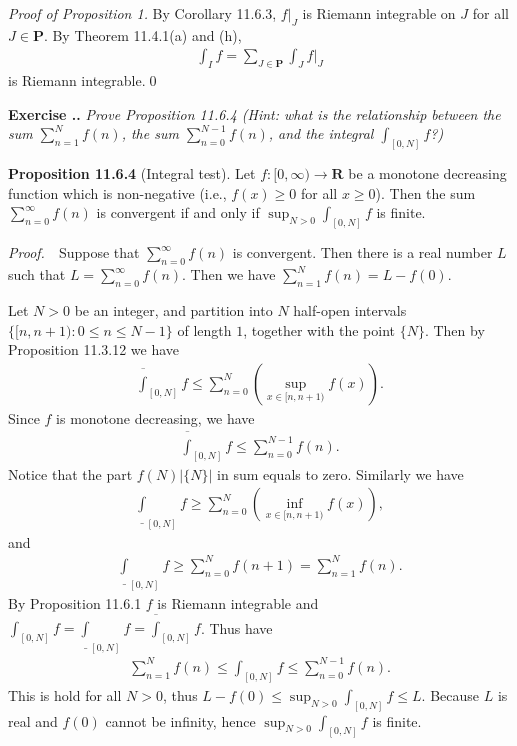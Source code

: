 \documentclass{book}
\newcommand{\pff}{\vspace{.25em}\noindent\emph{Proof.}~~}
\newcommand{\titl}[1]{\noindent\textbf{#1}}
\newcounter{Exercise}[section]
\renewcommand{\theExercise}{\thesection.\arabic{Exercise}.}
\newcommand{\new}{\vspace{1.5em}\noindent\textbf{{Exercise \stepcounter{Exercise}\textbf{\theExercise}}} }
\begin{document}
\noindent\emph{Proof of Proposition 1.} By Corollary 11.6.3, $f|_J$ is Riemann integrable on $J$ for all $J\in\mathbf{P}$. By Theorem 11.4.1(a) and (h),
    \begin{align*}
        \int_If=\sum_{J\in\mathbf{P}}\int_{J}f|_J
    \end{align*}
is Riemann integrable.\qed

\new\emph{Prove Proposition 11.6.4 (Hint: what is the relationship between the sum $\sum_{n = 1}^{N} f(n)$, the sum $\sum_{n = 0}^{N - 1} f(n)$, and the integral $\int_{[0, N]} f$?)}

\begin{framed}
\titl{Proposition 11.6.4} (Integral test). Let $f : [0, \infty) \to \mathbf{R}$ be a monotone decreasing function which is non-negative (i.e., $f(x) \geq 0$ for all $x \geq 0$). Then the sum $\sum_{n = 0}^{\infty} f(n)$ is convergent if and only if $\sup_{N > 0} \int_{[0, N]} f$ is finite.
\end{framed}

\pff Suppose that $\sum_{n = 0}^{\infty} f(n)$ is convergent. Then there is a real number $L$ such that $L = \sum_{n = 0}^{\infty} f(n)$. Then we have $\sum_{n = 1}^{N} f(n) = L - f(0)$.

Let $N > 0$ be an integer, and partition into $N$ half-open intervals $\{ [n, n + 1) : 0 \leq n \leq N - 1 \}$ of length $1$, together with the point $\{ N \}$. Then by Proposition 11.3.12 we have
    \begin{align*}
        \overline\int_{[0, N]} f \leq \sum_{n = 0}^{N} \left(\sup_{x \in [n, n+1)}f(x)\right).
    \end{align*}
Since $f$ is monotone decreasing, we have
    \begin{align*}
        \overline\int_{[0, N]} f \leq \sum_{n = 0}^{N - 1} f(n).
    \end{align*}
Notice that the part $f(N)|\{N\}|$ in sum equals to zero. Similarly we have
    \begin{align*}
        \underline\int_{[0, N]} f \geq \sum_{n = 0}^{N} \left(\inf_{x \in [n, n+1)} f(x)\right),
    \end{align*}
and
    \begin{align*}
        \underline\int_{[0, N]} f \geq \sum_{n = 0}^{N} f(n+1) = \sum_{n = 1}^{N} f(n).
    \end{align*}
By Proposition 11.6.1 $f$ is Riemann integrable and $\int_{[0, N]} f = \underline\int_{[0, N]} f = \overline\int_{[0, N]} f$. Thus have
    \begin{align*}
        \sum_{n = 1}^{N} f(n) \leq \int_{[0, N]} f \leq \sum_{n = 0}^{N - 1} f(n).
    \end{align*}
This is hold for all $N > 0$, thus $L - f(0) \leq \sup_{N > 0} \int_{[0, N]} f \leq L$. Because $L$ is real and $f(0)$ cannot be infinity, hence $\sup_{N > 0}\int_{[0, N]} f$ is finite.
\end{document}
